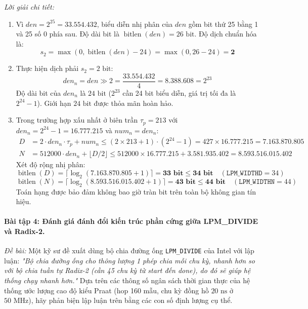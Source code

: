 \emph{Lời giải chi tiết:}
\begin{enumerate}[label=(\alph*), leftmargin=1.5em, itemsep=2pt]
    \item Vì $den = 2^{25} = 33.554.432$, biểu diễn nhị phân của $den$ gồm bit thứ 25 bằng 1 và 25 số 0 phía sau. Độ dài bit là $\operatorname{bitlen}(den) = 26\text{ bit}$. Độ dịch chuẩn hóa là:
    \begin{equation}
    s_2 = \max(0, \operatorname{bitlen}(den) - 24) = \max(0, 26 - 24) = \mathbf{2}
    \end{equation}
    \item Thực hiện dịch phải $s_2 = 2\text{ bit}$:
    \begin{equation}
    den_n = den \gg 2 = \frac{33.554.432}{4} = \mathbf{8.388.608} = 2^{23}
    \end{equation}
    Độ dài bit của $den_n$ là $24\text{ bit}$ ($2^{23}$ cần 24 bit biểu diễn, giá trị tối đa là $2^{24}-1$). Giới hạn $24\text{ bit}$ được thỏa mãn hoàn hảo.
    \item Trong trường hợp xấu nhất ở biên trần $\tau_p = 213$ với $den_n = 2^{24} - 1 = 16.777.215$ và $num_n = den_n$:
    \begin{align}
    D &= 2 \cdot den_n \cdot \tau_p + num_n \le (2 \times 213 + 1) \cdot (2^{24} - 1) = 427 \times 16.777.215 = \mathbf{7.163.870.805} \\
    N &= 512000 \cdot den_n + \lfloor D / 2 \rfloor \le 512000 \times 16.777.215 + 3.581.935.402 = \mathbf{8.593.516.015.402}
    \end{align}
    Xét độ rộng nhị phân:
    \begin{equation}
    \operatorname{bitlen}(D) = \lceil \log_2(7.163.870.805 + 1) \rceil = \mathbf{33\text{ bit}} \le \mathbf{34\text{ bit}} \quad (\texttt{LPM\_WIDTHD} = 34)
    \end{equation}
    \begin{equation}
    \operatorname{bitlen}(N) = \lceil \log_2(8.593.516.015.402 + 1) \rceil = \mathbf{43\text{ bit}} \le \mathbf{44\text{ bit}} \quad (\texttt{LPM\_WIDTHN} = 44)
    \end{equation}
    Toán hạng được bảo đảm không bao giờ tràn bit trên toàn bộ không gian tín hiệu.
\end{enumerate}

\paragraph{Bài tập 4: Đánh giá đánh đổi kiến trúc phần cứng giữa LPM\_DIVIDE và Radix-2.}
\emph{Đề bài:} Một kỹ sư đề xuất dùng bộ chia đường ống \texttt{LPM\_DIVIDE} của Intel với lập luận: \emph{"Bộ chia đường ống cho thông lượng 1 phép chia mỗi chu kỳ, nhanh hơn so với bộ chia tuần tự Radix-2 (cần 45 chu kỳ từ start đến done), do đó sẽ giúp hệ thống chạy nhanh hơn."} Dựa trên các thông số ngân sách thời gian thực của hệ thống ước lượng cao độ kiểu Praat (hop 160 mẫu, chu kỳ đồng hồ $20\text{ ns}$ ở $50\text{ MHz}$), hãy phản biện lập luận trên bằng các con số định lượng cụ thể.

